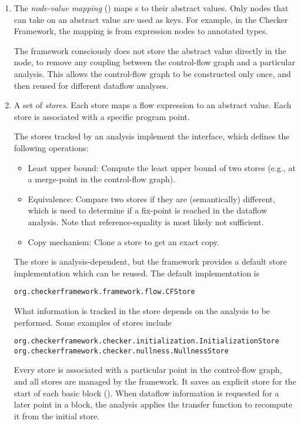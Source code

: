 \begin{enumerate}
\item
The \emph{node-value mapping} () maps s to their abstract
values.  Only nodes that can take on an abstract value are
used as keys.  For example, in the Checker Framework, the mapping is
from expression nodes to annotated types.

The framework consciously does not store the abstract value
directly in the node, to remove any coupling between the control-flow
graph and a particular analysis.  This allows the control-flow graph
to be constructed only once, and then reused for different dataflow
analyses.

\item
A set of \emph{stores}.  Each store maps a flow expression to an
abstract value.  Each store is associated with a specific program point.

The stores tracked by an analysis implement the 
interface, which defines the following operations:
\begin{itemize}
\item Least upper bound: Compute the least upper bound of two stores
  (e.g., at a merge-point in the control-flow graph).
\item Equivalence: Compare two stores if they are (semantically)
  different, which is used to determine if a fix-point is reached in
  the dataflow analysis. Note that reference-equality is most likely
  not sufficient.
\item Copy mechanism: Clone a store to get an exact copy.
\end{itemize}
The store is analysis-dependent, but the framework provides a default
store implementation which can be reused.  The default implementation
is
\begin{verbatim}org.checkerframework.framework.flow.CFStore\end{verbatim}

What information is tracked in the store depends on the analysis to be
 performed.  Some examples of stores include
\begin{verbatim}
org.checkerframework.checker.initialization.InitializationStore
org.checkerframework.checker.nullness.NullnessStore
\end{verbatim}

Every store is associated with a particular point in the control-flow
graph, and all stores are managed by the framework. It saves an explicit store
for the start of each basic block ().
When dataflow information
is requested for a later point in a block, the analysis applies the
transfer function to recompute it from the initial store.

\end{enumerate}

